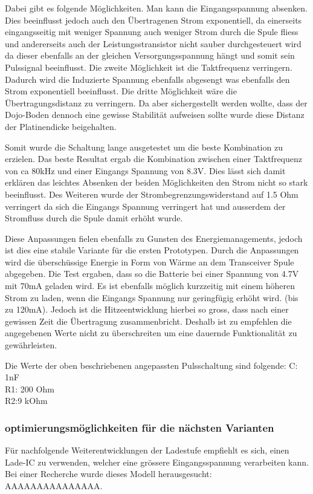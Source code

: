 Dabei gibt es folgende Möglichkeiten. Man kann die Eingangsspannung absenken. Dies beeinflusst jedoch auch den Übertragenen Strom exponentiell, da einerseits eingangsseitig mit weniger Spannung auch weniger Strom durch die Spule fliess und andererseits auch der Leistungsstransistor nicht sauber durchgesteuert wird da dieser ebenfalls an der gleichen Versorgungsspannung hängt und somit sein Pulssignal beeinflusst. Die zweite Möglichkeit ist die Taktfrequenz verringern. Dadurch wird die Induzierte Spannung ebenfalls abgesengt was ebenfalls den Strom exponentiell beeinflusst. Die dritte Möglichkeit wäre die Übertragungsdistanz zu verringern. Da aber sichergestellt werden wollte, dass der Dojo-Boden dennoch eine gewisse Stabilität aufweisen sollte wurde diese Distanz der Platinendicke beigehalten.

Somit wurde die Schaltung lange ausgetestet um die beste Kombination zu erzielen. Das beste Resultat ergab die Kombination zwischen einer Taktfrequenz von ca 80kHz und einer Eingangs Spannung von 8.3V. Dies lässt sich damit erklären das leichtes Absenken der beiden Möglichkeiten den Strom nicht so stark beeinflusst. Des Weiteren wurde der Strombegrenzungswiderstand auf 1.5 Ohm verringert da sich die Eingangs Spannung verringert hat und ausserdem der Stromfluss durch die Spule damit erhöht wurde. 

Diese Anpassungen fielen ebenfalls zu Gunsten des Energiemanagements, jedoch ist dies eine stabile Variante für die ersten Prototypen. Durch die Anpassungen wird die überschüssige Energie in Form von Wärme an dem Transceiver Spule abgegeben. Die Test ergaben, dass so die Batterie bei einer Spannung von 4.7V mit 70mA geladen wird. Es ist ebenfalls möglich kurzzeitig mit einem höheren Strom zu laden, wenn die Eingangs Spannung nur geringfügig erhöht wird. (bis zu 120mA). Jedoch ist die Hitzeentwicklung hierbei so gross, dass nach einer gewissen Zeit die Übertragung zusammenbricht. Deshalb ist zu empfehlen die angegebenen Werte nicht zu überschreiten um eine dauernde Funktionalität zu gewährleisten.

Die Werte der oben beschriebenen angepassten Pulsschaltung sind folgende:
C: 1nF\\
R1: 200 Ohm\\
R2:9 kOhm\\

\subsubsection*{optimierungsmöglichkeiten für die nächsten Varianten}\label{sec:energieuebertragung}
Für nachfolgende Weiterentwicklungen der Ladestufe empfiehlt es sich, einen Lade-IC zu verwenden, welcher eine grössere Eingangsspannung verarbeiten kann. Bei einer Recherche wurde dieses Modell herausgesucht: AAAAAAAAAAAAAAA.

